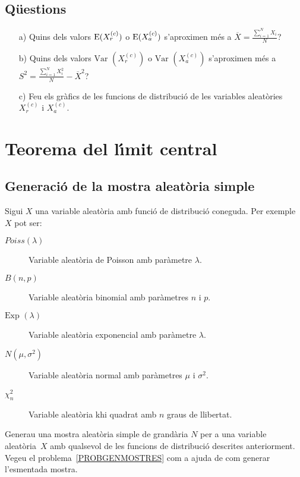\subsection*{Q\"uestions}
\begin{itemize}
\item[a)] Quins dels valors ${\rm E} (X_r^{(c)})$ o ${\rm E} (X_a^{(c)})$ s'aproximen
m\'es a $\overline{X}=\frac{\sum\limits_{i=1}^N X_i}{N}$?

\item[b)] Quins dels valors $\mbox{Var }(X_r^{(c)})$ o $\mbox{Var }
(X_a^{(c)})$ s'aproximen m\'es a \break $S^2 =\frac{\sum\limits_{i=1}^N 
X_i^2}{N}-\overline{X}^2$?
\enlargethispage*{1000pt}
\item[c)] Feu els gr\`afics de les funcions de distribuci\'o
 de les variables
aleat\`ories 
$X_r^{(c)}$ i $X_a^{(c)}$.
\end{itemize}

\newpage
\section{Teorema del l\'{\i}mit central}

\subsection{Generaci\'o de la mostra aleat\`oria simple}

Sigui $X$ una variable aleat\`oria  amb funci\'o de distribuci\'o coneguda. 
Per exemple $X$ pot ser:
\begin{description}
\item[$Poiss(\lambda)$] Variable aleat\`oria de Poisson 
amb par\`ametre
$\lambda$.

\item[$B(n,p)$] Variable aleat\`oria 
binomial amb par\`ametres 
$n$ i $p$.

\item[$\mbox{Exp }(\lambda)$] Variable aleat\`oria exponencial amb par\`ametre
$\lambda$.

\item[$N(\mu,\sigma^2)$] Variable aleat\`oria
 normal amb par\`ametres 
$\mu$ i $\sigma^2$.

\item[$\chi^2_n$] Variable aleat\`oria
 khi quadrat 
amb $n$ graus de llibertat.

\end{description}

Generau una mostra aleat\`oria 
simple de grand\`aria $N$ per a una variable aleat\`oria~$X$ amb qualsevol de 
les funcions de distribuci\'o descrites
anteriorment. Vegeu el problema~\ref{PROBGENMOSTRES} com a ajuda de com generar l'esmentada 
mostra.

